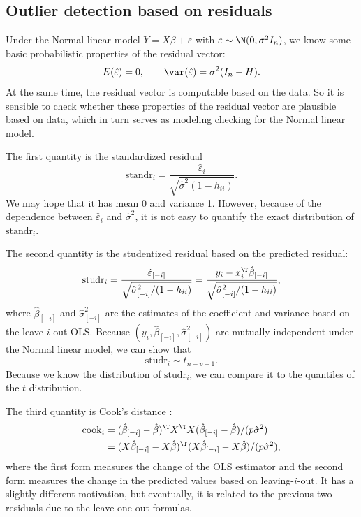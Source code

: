 \subsection{Outlier detection based on residuals}

Under the Normal linear model $Y=X\beta+\varepsilon$ with $\varepsilon\sim\N(0,\sigma^{2}I_{n})$,
we know some basic probabilistic properties of the residual vector:
\[
E(\hat{\varepsilon})=0,\qquad\var(\hat{\varepsilon})=\sigma^{2}(I_{n}-H).
\]
At the same time, the residual vector is computable based on the data.
So it is sensible to check whether these properties of the residual
vector are plausible based on data, which in turn serves as modeling
checking for the Normal linear model. 

The first quantity is the standardized residual
\[
\text{standr}_{i}=\frac{\hat{\varepsilon}_{i}}{\sqrt{\hat{\sigma}^{2}(1-h_{ii})}}.
\]
We may hope that it has mean 0 and variance 1. However, because
of the dependence between $\hat{\varepsilon}_{i}$ and $\hat{\sigma}^{2}$, it is not easy to quantify the exact distribution
of $\text{standr}_{i}$. 

The second quantity is the studentized residual
based on the predicted residual:
\[
\text{studr}_{i}=\frac{\hat{\varepsilon}_{[-i]}}{\sqrt{\hat{\sigma}_{[-i]}^{2}/(1-h_{ii})}}=\frac{y_{i}-x_{i}^{\T}\hat{\beta}_{[-i]}}{\sqrt{\hat{\sigma}_{[-i]}^{2}/(1-h_{ii})}},
\]
where $\hat{\beta}_{[-i]}$ and $\hat{\sigma}_{[-i]}^{2}$ are the estimates of the coefficient and variance based
on the leave-$i$-out OLS. Because $(y_{i},\hat{\beta}_{[-i]},\hat{\sigma}_{[-i]}^{2})$
are mutually independent under the Normal linear model, we can show
that 
\begin{equation}
\text{studr}_{i}\sim t_{n-p-1}.\label{eq:studentized-t}
\end{equation}
Because we know the  distribution of $\text{studr}_{i}$, we can compare it to the quantiles
of the $t$ distribution. 

The third quantity is Cook's distance \citep{cook1977detection}:
\begin{align*}
\text{cook}_{i} & =(\hat{\beta}_{[-i]}-\hat{\beta})^{\T}X^{\T}X(\hat{\beta}_{[-i]}-\hat{\beta})/(p\hat{\sigma}^{2})\\
 & =(X\hat{\beta}_{[-i]}-X\hat{\beta})^{\T}(X\hat{\beta}_{[-i]}-X\hat{\beta})/(p\hat{\sigma}^{2}),
\end{align*}
 where the first form measures the change of the OLS estimator and
the second form measures the change in the predicted values based
on leaving-$i$-out. It has a slightly different motivation, but
eventually, it is related to the previous two residuals due to the leave-one-out formulas. 

